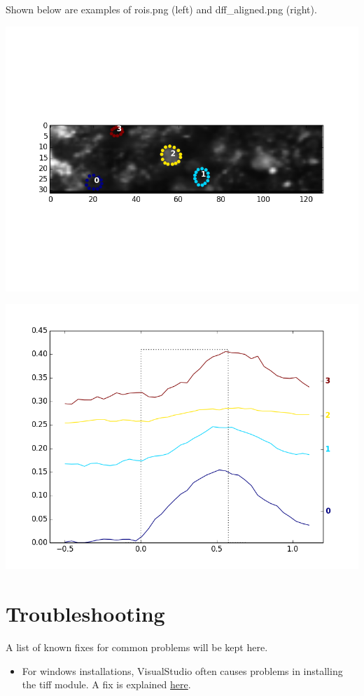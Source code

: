 \documentclass[letterpaper,10pt,english]{sphinxmanual}
\begin{document}
Shown below are examples of rois.png (left) and dff\_aligned.png (right).

\includegraphics[width=0.400\linewidth]{rois.png}

\includegraphics[width=0.400\linewidth]{dff_aligned.png}


\chapter{Troubleshooting}
\label{introduction:troubleshooting}
A list of known fixes for common problems will be kept here.
\begin{itemize}
\item {} 
For windows installations, VisualStudio often causes problems in installing the tiff module. A fix is explained \href{http://stackoverflow.com/questions/2817869/error-unable-to-find-vcvarsall-bat}{here}.

\end{itemize}
\end{document}
